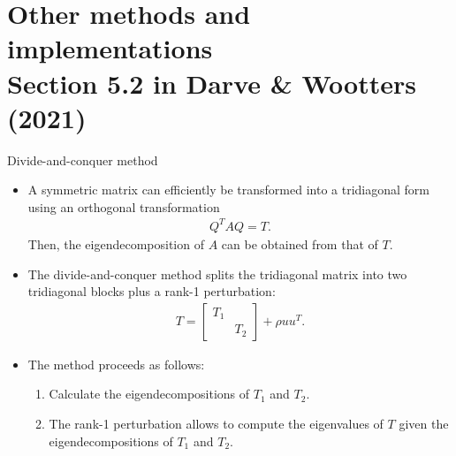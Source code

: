 \documentclass[t,usepdftitle=false]{beamer}
\begin{document}
\begin{comment}
\section{Improvements to QR iteration\\{\small Section 5.3 in Darve \& Wootters (2021)}}

\begin{frame}{Content}
\begin{itemize}
\item Content
\end{itemize}
\end{frame}
\end{comment}


\section{Other methods and implementations\\{\small Section 5.2 in Darve \& Wootters (2021)}}

\begin{frame}{Divide-and-conquer method}
\begin{itemize}
\item A symmetric matrix can efficiently be transformed into a tridiagonal form using an orthogonal transformation 
\begin{align*}
Q^TAQ=T.
\end{align*}
Then, the eigendecomposition of $A$ can be obtained from that of $T$. 
\item The divide-and-conquer method splits the tridiagonal matrix into two tridiagonal blocks plus a rank-1 perturbation:
\begin{align*}
T=\begin{bmatrix}T_1&\\&T_2\end{bmatrix}+\rho uu^T.
\end{align*}
\item The method proceeds as follows:
\begin{enumerate}\normalsize
\item Calculate the eigendecompositions of $T_1$ and $T_2$.\vspace{.1cm}
\item The rank-1 perturbation allows to compute the eigenvalues of $T$ given the eigendecompositions of $T_1$ and $T_2$.
\end{enumerate}
\end{itemize}
\end{frame}
\end{document}
